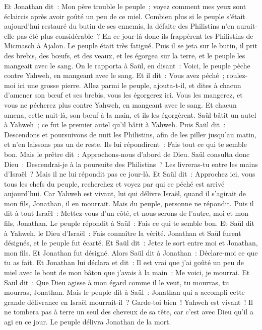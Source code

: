 \begin{multicols}{2}
Et Jonathan dit~: Mon père trouble le peuple~; voyez comment mes yeux sont éclaircis après avoir goûté un peu de ce miel.
Combien plus si le peuple s'était aujourd'hui restauré du butin de ses ennemis, la défaite des Philistins n'en aurait-elle pas été plus considérable~?
En ce jour-là donc ils frappèrent les Philistins de Micmasch à Ajalon. Le peuple était très fatigué.
Puis il se jeta sur le butin, il prit des brebis, des bœufs, et des veaux, et les égorgea sur la terre, et le peuple les mangeait avec le sang.
On le rapporta à Saül, en disant~: Voici, le peuple pèche contre Yahweh, en mangeant avec le sang. Et il dit~: Vous avez péché~; roulez-moi ici une grosse pierre.
Allez parmi le peuple, ajouta-t-il, et dites à chacun d'amener son bœuf et ses brebis, vous les égorgerez ici. Vous les mangerez, et vous ne pécherez plus contre Yahweh, en mangeant avec le sang. Et chacun amena, cette nuit-là, son bœuf à la main, et ils les égorgèrent.
Saül bâtit un autel à Yahweh~; ce fut le premier autel qu'il bâtit à Yahweh.
Puis Saül dit~: Descendons et poursuivons de nuit les Philistins, afin de les piller jusqu'au matin, et n'en laissons pas un de reste. Ils lui répondirent~: Fais tout ce qui te semble bon. Mais le prêtre dit~: Approchons-nous d'abord de Dieu.
Saül consulta donc Dieu~: Descendrai-je à la poursuite des Philistins~? Les livreras-tu entre les mains d'Israël~? Mais il ne lui répondit pas ce jour-là.
Et Saül dit~: Approchez ici, vous tous les chefs du peuple, recherchez et voyez par qui ce péché est arrivé aujourd'hui.
Car Yahweh est vivant, lui qui délivre Israël, quand il s'agirait de mon fils, Jonathan, il en mourrait. Mais du peuple, personne ne répondit.
Puis il dit à tout Israël~: Mettez-vous d'un côté, et nous serons de l'autre, moi et mon fils, Jonathan. Le peuple répondit à Saül~: Fais ce qui te semble bon.
Et Saül dit à Yahweh, le Dieu d'Israël~: Fais connaître la vérité. Jonathan et Saül furent désignés, et le peuple fut écarté.
Et Saül dit~: Jetez le sort entre moi et Jonathan, mon fils. Et Jonathan fut désigné.
Alors Saül dit à Jonathan~: Déclare-moi ce que tu as fait. Et Jonathan lui déclara et dit~: Il est vrai que j'ai goûté un peu de miel avec le bout de mon bâton que j'avais à la main~: Me voici, je mourrai.
Et Saül dit~: Que Dieu agisse à mon égard comme il le veut, tu mourras, tu mourras, Jonathan.
Mais le peuple dit à Saül~: Jonathan qui a accompli cette grande délivrance en Israël mourrait-il~? Garde-toi bien~! Yahweh est vivant~! Il ne tombera pas à terre un seul des cheveux de sa tête, car c'est avec Dieu qu'il a agi en ce jour. Le peuple délivra Jonathan de la mort.

\end{multicols}
